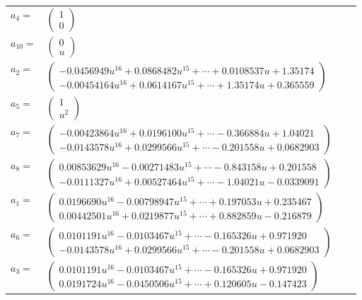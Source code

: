 \documentclass[1p]{elsarticle_modified}
\theoremstyle{definition}
\begin{document}
\begin{tabular}{m{7pt} m{180pt} m{7pt} m{180pt} }
\flushright $a_{4}=$&$\begin{pmatrix}1\\0\end{pmatrix}$ \\
\flushright $a_{10}=$&$\begin{pmatrix}0\\u\end{pmatrix}$ \\
\flushright $a_{2}=$&$\begin{pmatrix}-0.0456949 u^{16}+0.0868482 u^{15}+\cdots+0.0108537 u+1.35174\\-0.00454164 u^{16}+0.0614167 u^{15}+\cdots+1.35174 u+0.365559\end{pmatrix}$ \\
\flushright $a_{5}=$&$\begin{pmatrix}1\\u^2\end{pmatrix}$ \\
\flushright $a_{7}=$&$\begin{pmatrix}-0.00423864 u^{16}+0.0196100 u^{15}+\cdots-0.366884 u+1.04021\\-0.0143578 u^{16}+0.0299566 u^{15}+\cdots-0.201558 u+0.0682903\end{pmatrix}$ \\
\flushright $a_{8}=$&$\begin{pmatrix}0.00853629 u^{16}-0.00271483 u^{15}+\cdots-0.843158 u+0.201558\\-0.0111327 u^{16}+0.00527464 u^{15}+\cdots-1.04021 u-0.0339091\end{pmatrix}$ \\
\flushright $a_{1}=$&$\begin{pmatrix}0.0196690 u^{16}-0.00798947 u^{15}+\cdots+0.197053 u+0.235467\\0.00442501 u^{16}+0.0219877 u^{15}+\cdots+0.882859 u-0.216879\end{pmatrix}$ \\
\flushright $a_{6}=$&$\begin{pmatrix}0.0101191 u^{16}-0.0103467 u^{15}+\cdots-0.165326 u+0.971920\\-0.0143578 u^{16}+0.0299566 u^{15}+\cdots-0.201558 u+0.0682903\end{pmatrix}$ \\
\flushright $a_{3}=$&$\begin{pmatrix}0.0101191 u^{16}-0.0103467 u^{15}+\cdots-0.165326 u+0.971920\\0.0191724 u^{16}-0.0450506 u^{15}+\cdots+0.120605 u-0.147423\end{pmatrix}$ \\

\end{tabular}
\end{document}
